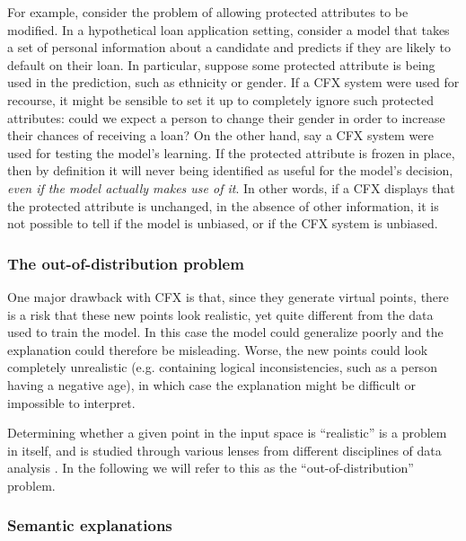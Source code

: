 \documentclass[../main.tex]{subfiles}
\begin{document}
For example, consider the problem of allowing protected attributes to be modified.
In a hypothetical loan application setting, consider a model that takes a set of personal information about a candidate and predicts if they are likely to default on their loan.
In particular, suppose some protected attribute is being used in the prediction, such as ethnicity or gender.
If a CFX system were used for recourse, it might be sensible to set it up to completely ignore such protected attributes: could we expect a person to change their gender in order to increase their chances of receiving a loan?
On the other hand, say a CFX system were used for testing the model's learning. If the protected attribute is frozen in place, then by definition it will never being identified as useful for the model's decision, \emph{even if the model actually makes use of it}.
In other words, if a CFX displays that the protected attribute is unchanged, in the absence of other information, it is not possible to tell if the model is unbiased, or if the CFX system is unbiased.

\subsubsection{The out-of-distribution problem}

One major drawback with CFX is that, since they generate virtual points, there is a risk that these new points look realistic, yet quite different from the data used to train the model.
In this case the model could generalize poorly and the explanation could therefore be misleading.
Worse, the new points could look completely unrealistic (e.g. containing logical inconsistencies, such as a person having a negative age), in which case the explanation might be difficult or impossible to interpret.

Determining whether a given point in the input space is ``realistic'' is a problem in itself, and is studied through various lenses from different disciplines of data analysis \cite{yangGeneralized2022}.
In the following we will refer to this as the ``out-of-distribution'' problem.

\subsubsection{Semantic explanations}
\label{intro/semanticity_problem}

\end{document}
